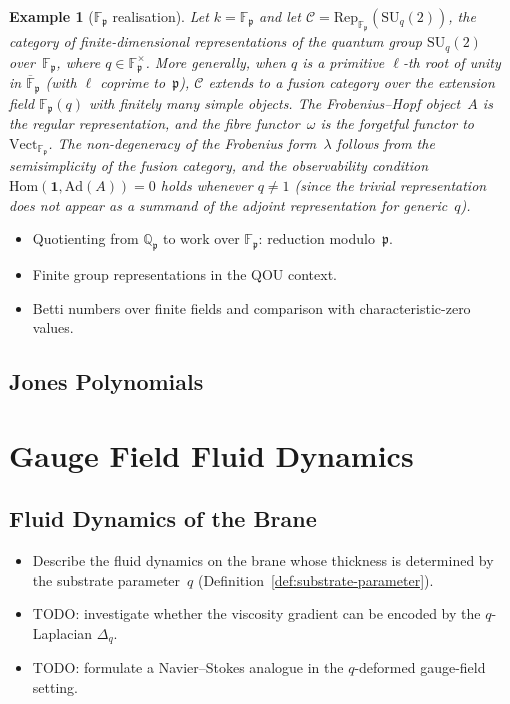 \documentclass[12pt,a4paper]{report}
\newtheorem{example}[theorem]{Example}
\newcommand{\pp}{\mathfrak{p}}
\begin{document}
\begin{example}[$\mathbb{F}_\pp$ realisation]
\label{ex:finite-field-realisation}
Let $k = \mathbb{F}_\pp$ and let $\mathcal{C} =
\mathrm{Rep}_{\mathbb{F}_\pp}(\mathrm{SU}_q(2))$, the category of
finite-dimensional representations of the quantum group
$\mathrm{SU}_q(2)$ over~$\mathbb{F}_\pp$, where $q \in
\mathbb{F}_\pp^{\times}$.  More generally, when $q$ is a primitive
$\ell$-th root of unity in $\overline{\mathbb{F}}_\pp$ (with $\ell$
coprime to~$\pp$), $\mathcal{C}$ extends to a fusion category over the
extension field $\mathbb{F}_\pp(q)$ with finitely many simple objects.
The Frobenius--Hopf object~$A$ is the regular representation, and
the fibre functor~$\omega$ is the forgetful functor to
$\mathrm{Vect}_{\mathbb{F}_\pp}$.  The non-degeneracy of the
Frobenius form~$\lambda$ follows from the semisimplicity of the fusion
category, and the observability condition
$\mathrm{Hom}(\mathbf{1}, \mathrm{Ad}(A)) = 0$ holds whenever $q \neq 1$
(since the trivial representation does not appear as a summand of the
adjoint representation for generic~$q$).
\end{example}

\begin{itemize}
  \item Quotienting from $\mathbb{Q}_\pp$ to work over $\mathbb{F}_\pp$:
        reduction modulo~$\pp$.
  \item Finite group representations in the QOU context.
  \item Betti numbers over finite fields and comparison with characteristic-zero
        values.
\end{itemize}



\section{Jones Polynomials}
\label{sec:jones-polynomials}

 \chapter{Gauge Field Fluid Dynamics}
\label{chap:gauge-fluid}



\section{Fluid Dynamics of the Brane}
\label{sec:brane-fluid}

\begin{itemize}
  \item Describe the fluid dynamics on the brane whose thickness is
        determined by the substrate parameter~$q$
        (Definition~\ref{def:substrate-parameter}).
  \item TODO: investigate whether the viscosity gradient can be encoded
        by the $q$-Laplacian $\Delta_q$.
  \item TODO: formulate a Navier--Stokes analogue in the $q$-deformed
        gauge-field setting.
\end{itemize}
\end{document}
